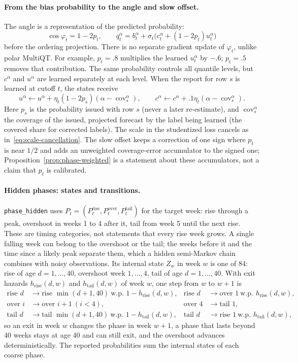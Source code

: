 \documentclass[11pt,a4paper]{article}
\DeclareMathOperator{\cov}{cov}
\theoremstyle{definition}
\theoremstyle{remark}
\begin{document}
\paragraph{From the bias probability to the angle and slow offset.}
The angle is a representation of the predicted probability:
\[
 \cos\varphi_t=1-2p_t,\qquad
 q_t^\alpha=b_t^\alpha+\sigma_t
 \bigl(c_t^\alpha+(1-2p_t)u_t^\alpha\bigr)
\]
before the ordering projection. There is no separate gradient update of
$\varphi_t$, unlike polar MultiQT. For example, $p_t=.8$ multiplies the
learned $u_t^\alpha$ by $-.6$; $p_t=.5$ removes that contribution. The
same probability controls all quantile levels, but $c^\alpha$ and
$u^\alpha$ are learned separately at each level. When the report for row
$s$ is learned at cutoff $t$, the states receive
\[
 u^\alpha\leftarrow u^\alpha+
 \eta_t(1-2p_s)(\alpha-\cov_s^\alpha),\qquad
 c^\alpha\leftarrow c^\alpha+
 .1\eta_t(\alpha-\cov_s^\alpha).
\]
Here $p_s$ is the probability issued with row $s$ (never a later
re-estimate), and $\cov_s^\alpha$ the coverage of the issued, projected
forecast by the label being learned (the covered share for corrected
labels). The scale in the studentized loss cancels as
in~\eqref{eq:scale-cancellation}. The slow offset keeps a correction of one
sign where $p_t$ is near $1/2$ and adds an unweighted coverage-error
accumulator to the signed one; Proposition~\ref{prop:phase-weighted} is a
statement about these accumulators, not a claim that $p_t$ is calibrated.

\paragraph{Hidden phases: states and transitions.}
\label{sec:hidden-phase-model}
\texttt{phase\_hidden} uses $P_t=(P_t^{\mathrm{rise}},P_t^{\mathrm{over}},
P_t^{\mathrm{tail}})$ for the target week: rise through a peak, overshoot
in weeks 1 to 4 after it, tail from week 5 until the next rise. These are
timing categories, not statements that every rise week grows. A single
falling week can belong to the overshoot or the tail; the weeks before it
and the time since a likely peak separate them, which a hidden
semi-Markov chain combines with noisy observations. Its internal state
$Z_w$ in week $w$ is one of 84: rise of age $d=1,\dots,40$, overshoot
week $1,\dots,4$, tail of age $d=1,\dots,40$. With exit hazards
$h_{\mathrm{rise}}(d,w)$ and $h_{\mathrm{tail}}(d,w)$ of week $w$, one step
from $w$ to $w+1$ is
\begin{align*}
 \text{rise }d&\to\text{rise }\min(d+1,40)\ \text{w.p. }1-h_{\mathrm{rise}}(d,w),
 &\text{rise }d&\to\text{over }1\ \text{w.p. }h_{\mathrm{rise}}(d,w),\\
 \text{over }i&\to\text{over }i+1\ (i<4),&\text{over }4&\to\text{tail }1,\\
 \text{tail }d&\to\text{tail }\min(d+1,40)\ \text{w.p. }1-h_{\mathrm{tail}}(d,w),
 &\text{tail }d&\to\text{rise }1\ \text{w.p. }h_{\mathrm{tail}}(d,w),
\end{align*}
so an exit in week $w$ changes the phase in week $w+1$, a phase that lasts
beyond 40 weeks stays at age 40 and can still exit, and the overshoot
advances deterministically. The reported probabilities sum the internal
states of each coarse phase.
\end{document}
